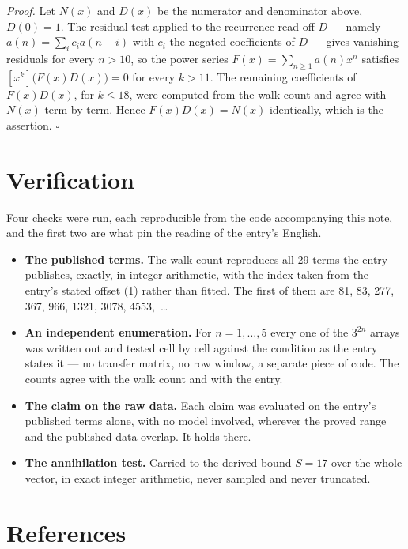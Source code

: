 \documentclass[11pt]{article}
\theoremstyle{definition}
\begin{document}
{\itshape Proof.} Let $N(x)$ and $D(x)$ be the numerator and denominator above, $D(0)=1$. The residual test applied to the recurrence read off $D$ --- namely $a(n) = \sum_i c_i a(n-i)$ with $c_i$ the negated coefficients of $D$ --- gives vanishing residuals for every $n > 10$, so the power series $F(x)=\sum_{n\ge 1}a(n)x^n$ satisfies $[x^k]\bigl(F(x)D(x)\bigr) = 0$ for every $k > 11$. The remaining coefficients of $F(x)D(x)$, for $k \le 18$, were computed from the walk count and agree with $N(x)$ term by term. Hence $F(x)D(x) = N(x)$ identically, which is the assertion. $\square$

\section{Verification}

Four checks were run, each reproducible from the code accompanying this note, and the first two are what pin the reading of the entry's English.

\begin{itemize}

\item {\bfseries The published terms.} The walk count reproduces all 29 terms the entry publishes, exactly, in integer arithmetic, with the index taken from the entry's stated offset (1) rather than fitted. The first of them are 81, 83, 277, 367, 966, 1321, 3078, 4553,~\dots

\item {\bfseries An independent enumeration.} For $n = 1,\dots,5$ every one of the $3^{2n}$ arrays was written out and tested cell by cell against the condition as the entry states it --- no transfer matrix, no row window, a separate piece of code. The counts agree with the walk count and with the entry.

\item {\bfseries The claim on the raw data.} Each claim was evaluated on the entry's published terms alone, with no model involved, wherever the proved range and the published data overlap. It holds there.

\item {\bfseries The annihilation test.} Carried to the derived bound $S = 17$ over the whole vector, in exact integer arithmetic, never sampled and never truncated.

\end{itemize}

\section{References}
\end{document}

